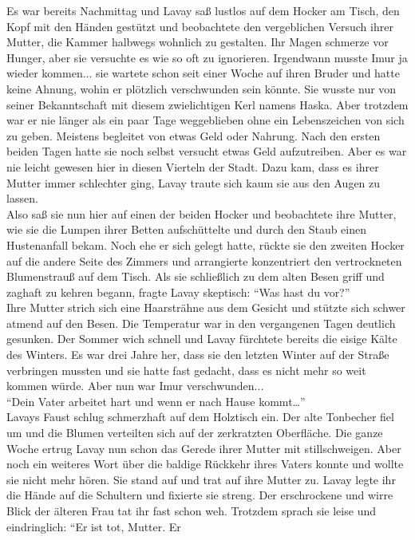 Es war bereits Nachmittag und Lavay saß lustlos auf dem Hocker am Tisch, den Kopf mit den Händen 
gestützt und beobachtete den vergeblichen Versuch ihrer Mutter, die Kammer halbwegs wohnlich zu 
gestalten. Ihr Magen schmerze vor Hunger, aber sie versuchte es wie so oft zu ignorieren. 
Irgendwann musste Imur ja wieder kommen... sie wartete schon seit einer Woche auf ihren Bruder 
und hatte keine Ahnung, wohin er plötzlich verschwunden sein könnte. Sie wusste nur von seiner 
Bekanntschaft mit diesem zwielichtigen Kerl namens Haska. Aber trotzdem war er nie länger als ein 
paar Tage weggeblieben ohne ein Lebenszeichen von sich zu geben. Meistens begleitet von etwas 
Geld oder Nahrung. Nach den ersten beiden Tagen hatte sie noch selbst versucht etwas Geld 
aufzutreiben. Aber es war nie leicht gewesen hier in diesen Vierteln der Stadt. Dazu kam, dass 
es ihrer Mutter immer schlechter ging, Lavay traute sich kaum sie aus den Augen zu lassen.\\
Also saß sie nun hier auf einen der beiden Hocker und beobachtete ihre Mutter, wie sie die 
Lumpen ihrer Betten aufschüttelte und durch den Staub einen Hustenanfall bekam. Noch ehe er sich 
gelegt hatte, rückte sie den zweiten Hocker auf die andere Seite des Zimmers und arrangierte 
konzentriert den vertrockneten Blumenstrauß auf dem Tisch. Als sie schließlich zu dem alten Besen 
griff und zaghaft zu kehren begann, fragte Lavay skeptisch: ``Was hast du vor?''\\
Ihre Mutter strich sich eine Haarsträhne aus dem Gesicht und stützte sich schwer atmend auf den 
Besen. Die Temperatur war in den vergangenen Tagen deutlich gesunken. Der Sommer wich schnell und 
Lavay fürchtete bereits die eisige Kälte des Winters. Es war drei Jahre her, dass sie den letzten 
Winter auf der Straße verbringen mussten und sie hatte fast gedacht, dass es nicht mehr so weit 
kommen würde. Aber nun war Imur verschwunden...\\
``Dein Vater arbeitet hart und wenn er nach Hause kommt…''\\
Lavays Faust schlug schmerzhaft auf dem Holztisch ein. Der alte Tonbecher fiel um und die Blumen 
verteilten sich auf der zerkratzten Oberfläche. Die ganze Woche ertrug Lavay nun schon das Gerede 
ihrer Mutter mit stillschweigen. Aber noch ein weiteres Wort über die baldige Rückkehr ihres Vaters 
konnte und wollte sie nicht mehr hören. Sie stand auf und trat auf ihre Mutter zu. Lavay legte ihr 
die Hände auf die Schultern und fixierte sie streng. Der erschrockene und wirre Blick der älteren 
Frau tat ihr fast schon weh. Trotzdem sprach sie leise und eindringlich: ``Er ist tot, Mutter. Er 
